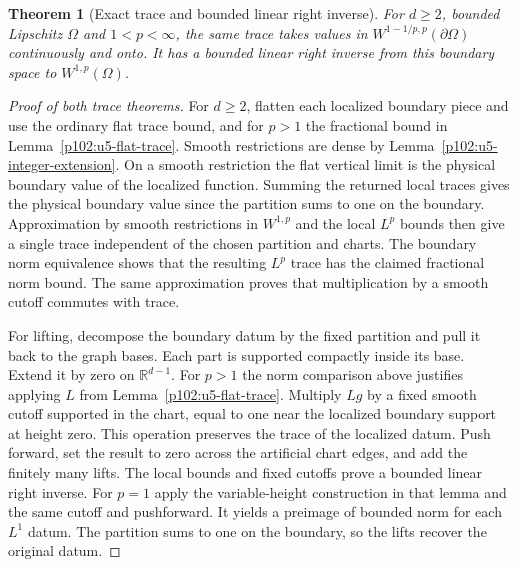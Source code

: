 \documentclass[11pt,oneside,openany]{book}
\newtheorem{theorem}{Theorem}[chapter]
\theoremstyle{definition}
\theoremstyle{remark}
\begin{document}
\begin{theorem}[Exact trace and bounded linear right inverse]
\label{p102:AN-11-C05-R03}
For \(d\ge2\), bounded Lipschitz \(\Omega\) and \(1<p<\infty\),
the same trace takes values in \(W^{1-1/p,p}(\partial\Omega)\)
continuously and onto. It has a bounded linear right inverse
from this boundary space to \(W^{1,p}(\Omega)\).
\end{theorem}
\begin{proof}[Proof of both trace theorems]
For \(d\ge2\), flatten each localized boundary piece and use the
ordinary flat trace bound, and for \(p>1\) the fractional bound in
Lemma~\ref{p102:u5-flat-trace}. Smooth restrictions are dense by
Lemma~\ref{p102:u5-integer-extension}. On a smooth restriction
the flat vertical limit is the physical boundary value of the
localized function. Summing the returned local traces gives the
physical boundary value since the partition sums to one on the
boundary. Approximation by smooth restrictions in \(W^{1,p}\)
and the local \(L^p\) bounds then give a single trace independent
of the chosen partition and charts. The boundary norm equivalence
shows that the resulting
\(L^p\) trace has the claimed fractional norm bound. The same
approximation proves that multiplication by a smooth cutoff
commutes with trace.

For lifting, decompose the boundary datum by the fixed partition
and pull it back to the graph bases. Each part is supported compactly
inside its base. Extend it by zero on \(\mathbb R^{d-1}\).
For \(p>1\) the norm comparison above justifies applying \(L\)
from Lemma~\ref{p102:u5-flat-trace}. Multiply \(Lg\) by a fixed
smooth cutoff supported in the chart, equal to one near the
localized boundary support at height zero. This operation preserves
the trace of the localized datum. Push forward, set the result
to zero across the artificial chart edges, and add the finitely
many lifts. The local bounds and fixed cutoffs prove a bounded
linear right inverse. For \(p=1\) apply the variable-height
construction in that lemma and the same cutoff and pushforward.
It yields a preimage of bounded norm for each \(L^1\) datum.
The partition sums to one on the boundary, so the lifts recover
the original datum.


\end{proof}
\end{document}
